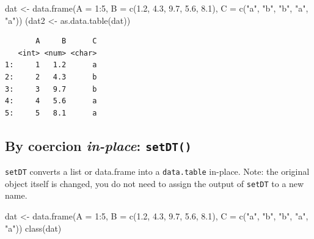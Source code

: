 \documentclass[
]{book}
\newenvironment{Shaded}{\begin{snugshade}}{\end{snugshade}}
\newcommand{\AttributeTok}[1]{\textcolor[rgb]{0.77,0.63,0.00}{#1}}
\newcommand{\DecValTok}[1]{\textcolor[rgb]{0.00,0.00,0.81}{#1}}
\newcommand{\FloatTok}[1]{\textcolor[rgb]{0.00,0.00,0.81}{#1}}
\newcommand{\FunctionTok}[1]{\textcolor[rgb]{0.00,0.00,0.00}{#1}}
\newcommand{\NormalTok}[1]{#1}
\newcommand{\OtherTok}[1]{\textcolor[rgb]{0.56,0.35,0.01}{#1}}
\newcommand{\SpecialCharTok}[1]{\textcolor[rgb]{0.00,0.00,0.00}{#1}}
\newcommand{\StringTok}[1]{\textcolor[rgb]{0.31,0.60,0.02}{#1}}
\begin{document}
\begin{Shaded}
\begin{Highlighting}[]
\NormalTok{dat }\OtherTok{\textless{}{-}} \FunctionTok{data.frame}\NormalTok{(}\AttributeTok{A =} \DecValTok{1}\SpecialCharTok{:}\DecValTok{5}\NormalTok{,}
                  \AttributeTok{B =} \FunctionTok{c}\NormalTok{(}\FloatTok{1.2}\NormalTok{, }\FloatTok{4.3}\NormalTok{, }\FloatTok{9.7}\NormalTok{, }\FloatTok{5.6}\NormalTok{, }\FloatTok{8.1}\NormalTok{),}
                  \AttributeTok{C =} \FunctionTok{c}\NormalTok{(}\StringTok{"a"}\NormalTok{, }\StringTok{"b"}\NormalTok{, }\StringTok{"b"}\NormalTok{, }\StringTok{"a"}\NormalTok{, }\StringTok{"a"}\NormalTok{))}
\NormalTok{(dat2 }\OtherTok{\textless{}{-}} \FunctionTok{as.data.table}\NormalTok{(dat))}
\end{Highlighting}
\end{Shaded}

\begin{verbatim}
       A     B      C
   <int> <num> <char>
1:     1   1.2      a
2:     2   4.3      b
3:     3   9.7      b
4:     4   5.6      a
5:     5   8.1      a
\end{verbatim}

\hypertarget{by-coercion-in-place-setdt}{%
\subsection{\texorpdfstring{By coercion \textbf{\emph{in-place}}: \texttt{setDT()}}{By coercion in-place: setDT()}}\label{by-coercion-in-place-setdt}}

\texttt{setDT} converts a list or data.frame into a \texttt{data.table} in-place. Note: the original object itself is changed, you do not need to assign the output of \texttt{setDT} to a new name.

\begin{Shaded}
\begin{Highlighting}[]
\NormalTok{dat }\OtherTok{\textless{}{-}} \FunctionTok{data.frame}\NormalTok{(}\AttributeTok{A =} \DecValTok{1}\SpecialCharTok{:}\DecValTok{5}\NormalTok{,}
                  \AttributeTok{B =} \FunctionTok{c}\NormalTok{(}\FloatTok{1.2}\NormalTok{, }\FloatTok{4.3}\NormalTok{, }\FloatTok{9.7}\NormalTok{, }\FloatTok{5.6}\NormalTok{, }\FloatTok{8.1}\NormalTok{),}
                  \AttributeTok{C =} \FunctionTok{c}\NormalTok{(}\StringTok{"a"}\NormalTok{, }\StringTok{"b"}\NormalTok{, }\StringTok{"b"}\NormalTok{, }\StringTok{"a"}\NormalTok{, }\StringTok{"a"}\NormalTok{))}
\FunctionTok{class}\NormalTok{(dat)}
\end{Highlighting}
\end{Shaded}
\end{document}
